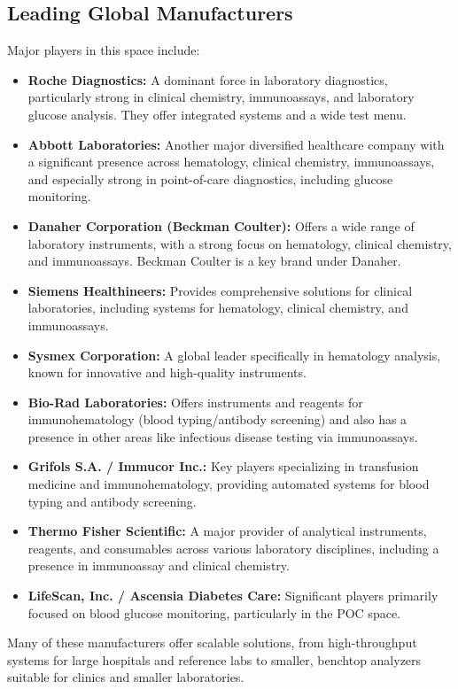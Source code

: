 \documentclass{article}
\begin{document}
\subsection{Leading Global Manufacturers}
Major players in this space include:
\begin{itemize}
    \item \textbf{Roche Diagnostics:} A dominant force in laboratory diagnostics, particularly strong in clinical chemistry, immunoassays, and laboratory glucose analysis. They offer integrated systems and a wide test menu.
    \item \textbf{Abbott Laboratories:} Another major diversified healthcare company with a significant presence across hematology, clinical chemistry, immunoassays, and especially strong in point-of-care diagnostics, including glucose monitoring.
    \item \textbf{Danaher Corporation (Beckman Coulter):} Offers a wide range of laboratory instruments, with a strong focus on hematology, clinical chemistry, and immunoassays. Beckman Coulter is a key brand under Danaher.
    \item \textbf{Siemens Healthineers:} Provides comprehensive solutions for clinical laboratories, including systems for hematology, clinical chemistry, and immunoassays.
    \item \textbf{Sysmex Corporation:} A global leader specifically in hematology analysis, known for innovative and high-quality instruments.
    \item \textbf{Bio-Rad Laboratories:} Offers instruments and reagents for immunohematology (blood typing/antibody screening) and also has a presence in other areas like infectious disease testing via immunoassays.
    \item \textbf{Grifols S.A. / Immucor Inc.:} Key players specializing in transfusion medicine and immunohematology, providing automated systems for blood typing and antibody screening.
    \item \textbf{Thermo Fisher Scientific:} A major provider of analytical instruments, reagents, and consumables across various laboratory disciplines, including a presence in immunoassay and clinical chemistry.
    \item \textbf{LifeScan, Inc. / Ascensia Diabetes Care:} Significant players primarily focused on blood glucose monitoring, particularly in the POC space.
\end{itemize}
Many of these manufacturers offer scalable solutions, from high-throughput systems for large hospitals and reference labs to smaller, benchtop analyzers suitable for clinics and smaller laboratories.
\end{document}
